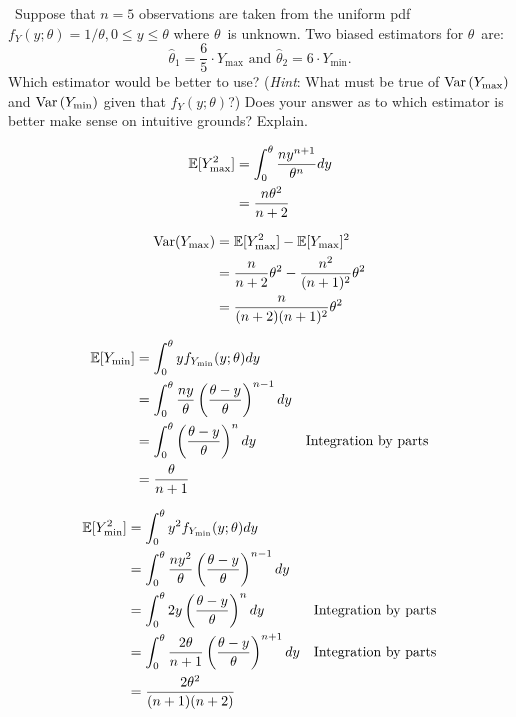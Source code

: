 \begin{problem}
  ~Suppose that ${n = 5}$ observations are taken from the uniform pdf ${f_{Y}(y;\theta) = 1/\theta, 0 \leq y \leq \theta}$ where $\theta$~is unknown.  Two biased estimators for $\theta$~are:
  \begin{equation*}
    \hat{\theta}_1 = \frac{6}{5} \cdot Y_{\max} \text{ and } \hat{\theta}_2 = 6\cdot Y_{\min}\text{.}
  \end{equation*}
  \noindent
  Which estimator would be better to use? (\textit{Hint}: What must be true of $\text{Var}\left(Y_{\max}\right)$ and $\text{Var}\left(Y_{\min}\right)$ given that ${f_{Y}(y;\theta)}$?) Does your answer as to which estimator is better make sense on intuitive grounds? Explain.
\end{problem}

\begin{align*}
  \mathbb{E}\lbrack Y_{\max}^2\rbrack &= \int_{0}^{\theta} \frac{n y^{n+1}}{\theta^{n}} dy \\
                                &= \frac{n\theta^2}{n+2}
\end{align*}

\begin{align*}
  \text{Var}(Y_{\max}) &= \mathbb{E}\lbrack Y_{\max}^2\rbrack - \mathbb{E}\lbrack Y_{\max}\rbrack^{2} \\
                       &= \frac{n}{n+2}\theta^2 - \frac{n^2}{(n+1)^{2}}\theta^2 \\
                       &= \frac{n}{(n+2)(n+1)^{2}}\theta^{2}
\end{align*}

\begin{align*}
  \mathbb{E}\lbrack Y_{\min}\rbrack &= \int_{0}^{\theta} y f_{Y_{\min}}(y;\theta)dy \\
                    &= \int_{0}^{\theta} \frac{ny}{\theta}\left(\frac{\theta -y}{\theta}\right)^{n-1} dy \\
                    &= \int_{0}^{\theta} \left(\frac{\theta -y}{\theta}\right)^{n} dy & \text{Integration by parts} \\
                    &= \frac{\theta}{n+1}
\end{align*}

\begin{align*}
  \mathbb{E}\lbrack Y_{\min}^{2}\rbrack &= \int_{0}^{\theta} y^2 f_{Y_{\min}}(y;\theta)dy \\
                    &= \int_{0}^{\theta} \frac{ny^2}{\theta}\left(\frac{\theta -y}{\theta}\right)^{n-1} dy \\
                    &= \int_{0}^{\theta} 2y\left(\frac{\theta -y}{\theta}\right)^{n} dy & \text{Integration by parts} \\
                    &= \int_{0}^{\theta} \frac{2\theta}{n+1} \left(\frac{\theta -y}{\theta}\right)^{n+1} dy & \text{Integration by parts} \\
                    &= \frac{2\theta^2}{(n+1)(n+2)}
\end{align*}

